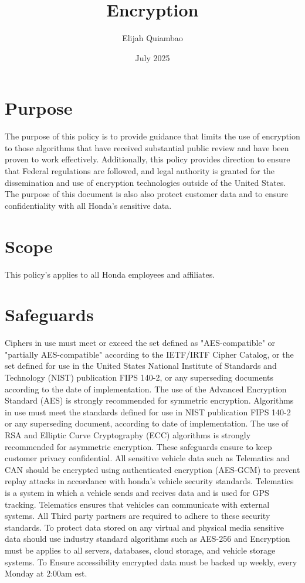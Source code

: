 \documentclass{article}
\title{Encryption}
\author{Elijah Quiambao}
\date{July 2025}
\begin{document}
\section{Purpose }

The purpose of this policy is to provide guidance that limits the use of encryption to those algorithms that have received substantial public review and have been proven to work effectively. Additionally, this policy provides direction to ensure that Federal regulations are followed, and legal authority is granted for the dissemination and use of encryption technologies outside of the United States. The purpose of this document is also also protect customer data and to ensure confidentiality with all Honda's sensitive data. 

\section{Scope}
This policy's applies to all Honda employees and affiliates.

\section{Safeguards}
Ciphers in use must meet or exceed the set defined as "AES-compatible" or "partially AES-compatible" according to the IETF/IRTF Cipher Catalog, or the set defined for use in the United States National Institute of Standards and Technology (NIST) publication FIPS 140-2, or any superseding documents according to the date of implementation. The use of the Advanced Encryption Standard (AES) is strongly recommended for symmetric encryption.
Algorithms in use must meet the standards defined for use in NIST publication FIPS 140-2 or any superseding document, according to date of implementation. The use of RSA and Elliptic Curve Cryptography (ECC) algorithms is strongly recommended for asymmetric encryption. These safeguards ensure to keep customer privacy confidential. All sensitive vehicle data such as Telematics and CAN should be encrypted using authenticated encryption (AES-GCM) to prevent replay attacks in accordance with honda's vehicle security standards. Telematics is a system in which a vehicle sends and recives data and is used for GPS tracking. Telematics ensures that vehicles can communicate with external systems. All Third party partners are required to adhere to these security standards. To protect data stored on any virtual and physical media sensitive data should use industry standard algorithms such as AES-256 and Encryption must be applies to all servers, databases, cloud storage, and  vehicle storage systems. To Ensure accessibility encrypted data must be backed up weekly, every Monday at 2:00am est. 
\end{document}
